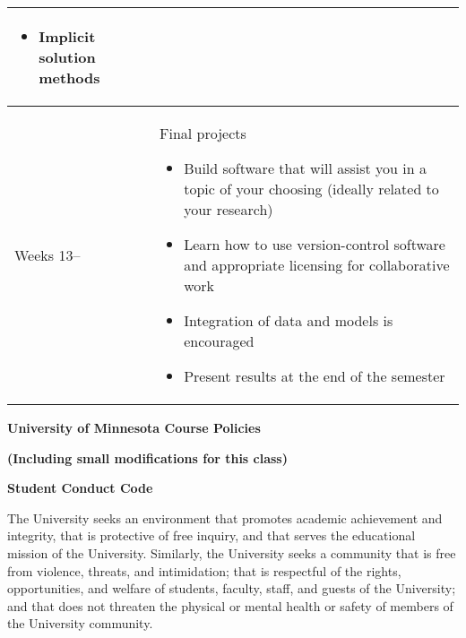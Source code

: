\documentclass[11pt]{article}
\begin{document}
\begin{longtable}[th!]{|p{.75in}|p{5.75in}|}
\begin{minipage}{.85\textwidth}
\begin{minipage}{4.9in}
\begin{itemize}
\begin{itemize}
	    \item Implicit solution methods
	  \end{itemize}
	\end{itemize}
	\vspace{1mm}
	\end{minipage}
\end{minipage} \\
\hline
\noindent Weeks 13-- & \begin{minipage}{.85\textwidth}
	\begin{minipage}{4.9in}
	\vspace{1mm}
	Final projects
	\begin{itemize} \itemsep0em 
	  \item Build software that will assist you in a topic of your choosing (ideally related to your research)
	  \item Learn how to use version-control software and appropriate licensing for collaborative work
	  \item Integration of data and models is encouraged
	  \item Present results at the end of the semester
	\end{itemize}
	\vspace{1mm}
	\end{minipage}
\end{minipage} \\
\hline
\end{longtable}


\vspace{24pt}
\noindent\textbf{\Large University of Minnesota Course Policies}

\noindent\textbf{(Including small modifications for this class)}

\vspace{10pt}
\noindent\textbf{Student Conduct Code}

\hspace{3mm}
The University seeks an environment that promotes academic achievement and integrity, that is protective of free inquiry, and that serves the educational mission of the University. Similarly, the University seeks a community that is free from violence, threats, and intimidation; that is respectful of the rights, opportunities, and welfare of students, faculty, staff, and guests of the University; and that does not threaten the physical or mental health or safety of members of the University community.
\end{document}
